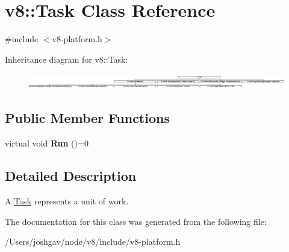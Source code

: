 \hypertarget{classv8_1_1_task}{}\section{v8\+:\+:Task Class Reference}
\label{classv8_1_1_task}


{\ttfamily \#include $<$v8-\/platform.\+h$>$}

Inheritance diagram for v8\+:\+:Task\+:\begin{figure}[H]
\begin{center}
\leavevmode
\includegraphics[height=0.665083cm]{classv8_1_1_task}
\end{center}
\end{figure}
\subsection*{Public Member Functions}
\begin{DoxyCompactItemize}
\item 
virtual void {\bfseries Run} ()=0\hypertarget{classv8_1_1_task_a6bd5bda0e357fcc2e727bf7b0170f99a}{}\label{classv8_1_1_task_a6bd5bda0e357fcc2e727bf7b0170f99a}

\end{DoxyCompactItemize}


\subsection{Detailed Description}
A \hyperlink{classv8_1_1_task}{Task} represents a unit of work. 

The documentation for this class was generated from the following file\+:\begin{DoxyCompactItemize}
\item 
/\+Users/joshgav/node/v8/include/v8-\/platform.\+h\end{DoxyCompactItemize}
